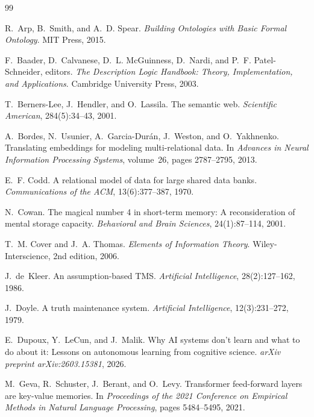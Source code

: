 \documentclass[11pt]{article}
\theoremstyle{definition}
\begin{document}

\begin{thebibliography}{99}

R.~Arp, B.~Smith, and A.~D. Spear.
\newblock \emph{Building Ontologies with Basic Formal Ontology}.
\newblock MIT Press, 2015.

F.~Baader, D.~Calvanese, D.~L. McGuinness, D.~Nardi, and P.~F.
  Patel-Schneider, editors.
\newblock \emph{The Description Logic Handbook: Theory, Implementation, and
  Applications}.
\newblock Cambridge University Press, 2003.

T.~Berners-Lee, J.~Hendler, and O.~Lassila.
\newblock The semantic web.
\newblock \emph{Scientific American}, 284(5):34--43, 2001.

A.~Bordes, N.~Usunier, A.~Garcia-Dur{\'a}n, J.~Weston, and
  O.~Yakhnenko.
\newblock Translating embeddings for modeling multi-relational data.
\newblock In \emph{Advances in Neural Information Processing Systems},
  volume~26, pages 2787--2795, 2013.

E.~F. Codd.
\newblock A relational model of data for large shared data banks.
\newblock \emph{Communications of the ACM}, 13(6):377--387, 1970.

N.~Cowan.
\newblock The magical number 4 in short-term memory: A reconsideration of
  mental storage capacity.
\newblock \emph{Behavioral and Brain Sciences}, 24(1):87--114, 2001.

T.~M. Cover and J.~A. Thomas.
\newblock \emph{Elements of Information Theory}.
\newblock Wiley-Interscience, 2nd edition, 2006.

J.~de~Kleer.
\newblock An assumption-based {TMS}.
\newblock \emph{Artificial Intelligence}, 28(2):127--162, 1986.

J.~Doyle.
\newblock A truth maintenance system.
\newblock \emph{Artificial Intelligence}, 12(3):231--272, 1979.

E.~Dupoux, Y.~LeCun, and J.~Malik.
\newblock Why {AI} systems don't learn and what to do about it: Lessons on
  autonomous learning from cognitive science.
\newblock \emph{arXiv preprint arXiv:2603.15381}, 2026.

M.~Geva, R.~Schuster, J.~Berant, and O.~Levy.
\newblock Transformer feed-forward layers are key-value memories.
\newblock In \emph{Proceedings of the 2021 Conference on Empirical Methods in
  Natural Language Processing}, pages 5484--5495, 2021.


\end{thebibliography}
\end{document}
